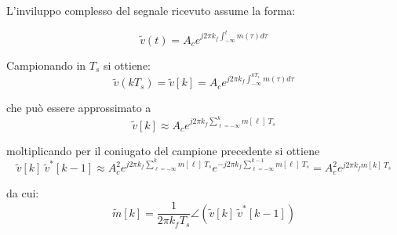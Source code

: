 L'inviluppo complesso del segnale ricevuto assume la forma:

\[
    \tilde{v}(t) = A_c e^{j2\pi k_f \int_{-\infty}^{t} m(\tau) d\tau}
\]

Campionando in $T_s$ si ottiene:
\[
    \tilde{v}(kT_s) = \tilde{v}[k] = A_c e^{j2\pi k_f \int_{-\infty}^{kT_s} m(\tau) d\tau}
\]

che può essere approssimato a 
\[
    \tilde{v}[k] \approx A_c e^{j2\pi k_f \sum_{\ell = -\infty}^{k} m[\ell] \ T_s}
\]

moltiplicando per il coniugato del campione precedente si ottiene
\[
    \tilde{v}[k] \ \tilde{v}^*[k-1] \approx A_c^2 e^{j2\pi k_f \sum_{\ell = -\infty}^{k} m[\ell] \ T_s} e^{-j2\pi k_f \sum_{\ell = -\infty}^{k-1} m[\ell] \ T_s} = A_c^2 e^{j2\pi k_f m[k] \ T_s}
\]

da cui:
\[
    \tilde{m}[k] = \frac{1}{2\pi k_f T_s} \angle \left( \tilde{v}[k] \ \tilde{v}^*[k-1] \right)
\]



